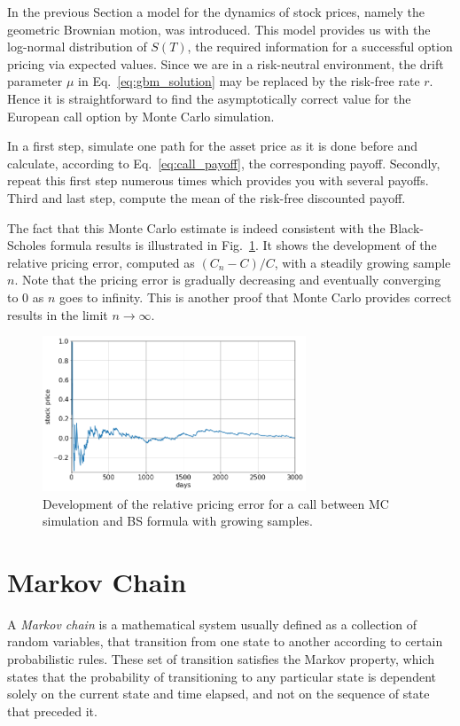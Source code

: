 In the previous Section a model for the dynamics of stock prices, namely the geometric Brownian motion, was introduced. This model provides us with the log-normal distribution of $S(T)$, the required information for a successful option pricing via expected values. Since we are in a risk-neutral environment, the drift parameter $\mu$ in Eq.~\ref{eq:gbm_solution} may be replaced by the risk-free rate $r$. Hence it is straightforward to find the asymptotically correct value for the European call option by Monte Carlo simulation. 

In a first step, simulate one path for the asset price as it is done before and calculate, according to Eq.~\ref{eq:call_payoff}, the corresponding payoff. Secondly, repeat this first step numerous times which provides you with several payoffs. Third and last step, compute the mean of the risk-free discounted payoff. 

The fact that this Monte Carlo estimate is indeed consistent with the Black-Scholes formula results is illustrated in Fig.~\ref{fig:error_BS}. It shows the development of the relative pricing error, computed as $(C_n − C)/C$, with a steadily growing sample $n$. Note that the pricing error is gradually decreasing and eventually converging to 0 as $n$ goes to infinity. This is another proof that Monte Carlo provides correct results in the limit $n\rightarrow\infty$.

\begin{figure}[htb]
	\centering
	\includegraphics[width=0.7\textwidth]{figures/call_pricing_error.png}
	\caption{Development of the relative pricing error for a call between MC simulation and BS formula with growing samples.}
	\label{fig:error_BS}
\end{figure}

\section{Markov Chain}
\label{sec:markov_chain}
A \emph{Markov chain} is a mathematical system usually defined as a collection of random variables, that transition from one state to another according to certain probabilistic rules. These set of transition satisfies the Markov property, which states that the probability of transitioning to any particular state is dependent solely on the current state and time elapsed, and not on the sequence of state that preceded it. 


